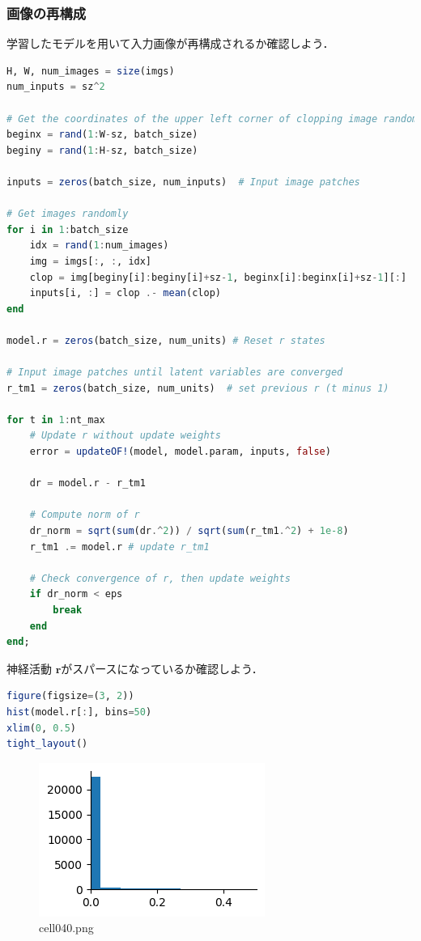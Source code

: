 \subsubsection{画像の再構成}
学習したモデルを用いて入力画像が再構成されるか確認しよう．
\begin{lstlisting}[language=julia]
H, W, num_images = size(imgs)
num_inputs = sz^2

# Get the coordinates of the upper left corner of clopping image randomly.
beginx = rand(1:W-sz, batch_size)
beginy = rand(1:H-sz, batch_size)

inputs = zeros(batch_size, num_inputs)  # Input image patches

# Get images randomly
for i in 1:batch_size        
    idx = rand(1:num_images)
    img = imgs[:, :, idx]
    clop = img[beginy[i]:beginy[i]+sz-1, beginx[i]:beginx[i]+sz-1][:]
    inputs[i, :] = clop .- mean(clop)
end

model.r = zeros(batch_size, num_units) # Reset r states

# Input image patches until latent variables are converged 
r_tm1 = zeros(batch_size, num_units)  # set previous r (t minus 1)

for t in 1:nt_max
    # Update r without update weights 
    error = updateOF!(model, model.param, inputs, false)

    dr = model.r - r_tm1 

    # Compute norm of r
    dr_norm = sqrt(sum(dr.^2)) / sqrt(sum(r_tm1.^2) + 1e-8)
    r_tm1 .= model.r # update r_tm1

    # Check convergence of r, then update weights
    if dr_norm < eps
        break
    end
end;
\end{lstlisting}
神経活動 $\mathbf{r}$がスパースになっているか確認しよう．
\begin{lstlisting}[language=julia]
figure(figsize=(3, 2))
hist(model.r[:], bins=50)
xlim(0, 0.5)
tight_layout()
\end{lstlisting}
\begin{figure}[ht]
	\centering
	\includegraphics[scale=0.8, max width=\linewidth]{./fig/energy-based-model/sparse-coding/cell040.png}
	\caption{cell040.png}
	\label{cell040.png}
\end{figure}
